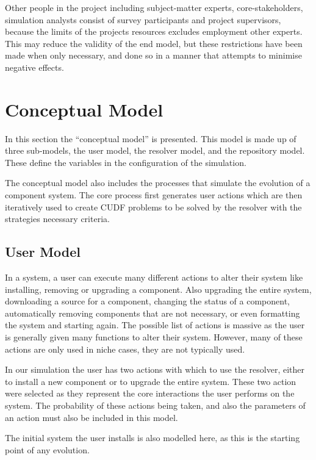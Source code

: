 Other people in the project including subject-matter experts, core-stakeholders, simulation analysts consist of survey participants and
project supervisors, because the limits of the projects resources excludes employment other experts.
This may reduce the validity of the end model, but these restrictions have been made when only necessary,
and done so in a manner that attempts to minimise negative effects.

\section{Conceptual Model}
In this section the ``conceptual model'' is presented.
This model is made up of three sub-models, the user model, the resolver model, and the repository model.
These define the variables in the configuration of the simulation.

The conceptual model also includes the processes that simulate the evolution of a component system.
The core process first generates user actions which are then iteratively used to create CUDF problems to be solved by the resolver with the strategies necessary criteria.

\subsection{User Model}
In a system, a user can execute many different actions to alter their system like installing, removing or upgrading a component.
Also upgrading the entire system, downloading a source for a component, changing the status of a component, 
automatically removing components that are not necessary, or even formatting the system and starting again.
The possible list of actions is massive as the user is generally given many functions to alter their system.
However, many of these actions are only used in niche cases, they are not typically used.

In our simulation the user has two actions with which to use the resolver, either to install a new component or to upgrade the entire system.
These two action were selected as they represent the core interactions the user performs on the system.
The probability of these actions being taken, and also the parameters of an action must also be included in this model.

The initial system the user installs is also modelled here, as this is the starting point of any evolution.

